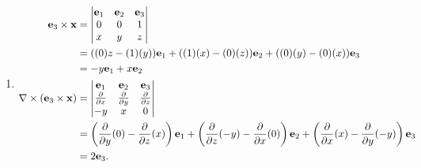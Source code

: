 \documentclass[10pt, a4paper]{article}
\begin{document}
\begin{problem}[$2007$ Question $1$]
\begin{solution}
\begin{enumerate}[label = (\roman*)]
            \item
            \begin{align*}
                \mathbf{e}_3 \times \mathbf{x} &= \begin{vmatrix}
                    \mathbf{e}_1 & \mathbf{e}_2 & \mathbf{e}_3 \\
                    0 & 0 & 1 \\
                    x & y & z
                \end{vmatrix} \\
                &= ((0)z - (1)(y))\mathbf{e}_1 + ((1)(x) - (0)(z))\mathbf{e}_2 + ((0)(y) - (0)(x))\mathbf{e}_3 \\
                &= -y\mathbf{e}_1 + x\mathbf{e}_2 \\
                \mathbf{\nabla} \times (\mathbf{e}_3 \times \mathbf{x}) &= \begin{vmatrix}
                    \mathbf{e}_1 & \mathbf{e}_2 & \mathbf{e}_3 \\
                    \frac{\partial }{\partial x} & \frac{\partial }{\partial y} & \frac{\partial }{\partial z} \\
                    -y & x & 0
                \end{vmatrix} \\
                &= \left(\frac{\partial }{\partial y}(0) - \frac{\partial }{\partial z}(x)\right)\mathbf{e}_1 + \left(\frac{\partial }{\partial z}(-y) - \frac{\partial }{\partial x}(0)\right)\mathbf{e}_2 + \left(\frac{\partial }{\partial x}(x) - \frac{\partial }{\partial y}(-y)\right)\mathbf{e}_3 \\
                &= 2\mathbf{e}_3.
            \end{align*}
        \end{enumerate}
    \end{solution}
\end{problem}
\end{document}
